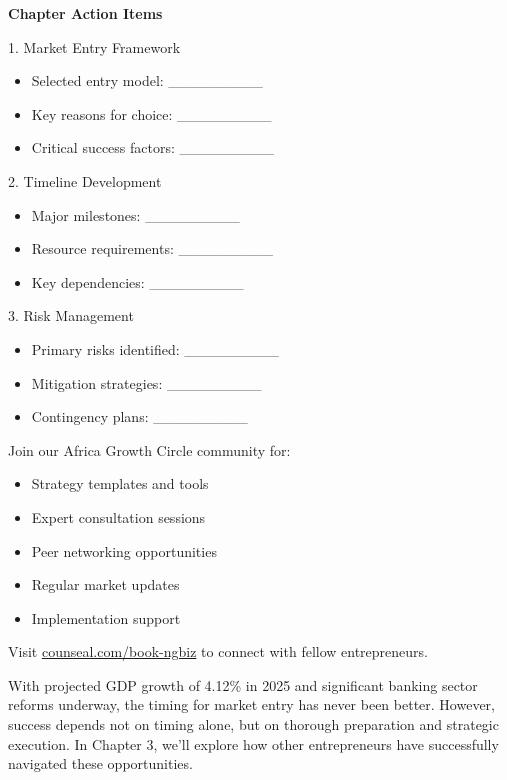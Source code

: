 \begin{workshopbox}
\textbf{Chapter Action Items}

1. Market Entry Framework
\begin{itemize}
    \item Selected entry model: \_\_\_\_\_\_\_\_\_
    \item Key reasons for choice: \_\_\_\_\_\_\_\_\_
    \item Critical success factors: \_\_\_\_\_\_\_\_\_
\end{itemize}

2. Timeline Development
\begin{itemize}
    \item Major milestones: \_\_\_\_\_\_\_\_\_
    \item Resource requirements: \_\_\_\_\_\_\_\_\_
    \item Key dependencies: \_\_\_\_\_\_\_\_\_
\end{itemize}

3. Risk Management
\begin{itemize}
    \item Primary risks identified: \_\_\_\_\_\_\_\_\_
    \item Mitigation strategies: \_\_\_\_\_\_\_\_\_
    \item Contingency plans: \_\_\_\_\_\_\_\_\_
\end{itemize}
\end{workshopbox}

\begin{communitybox}
Join our Africa Growth Circle community for:
\begin{itemize}
    \item Strategy templates and tools
    \item Expert consultation sessions
    \item Peer networking opportunities
    \item Regular market updates
    \item Implementation support
\end{itemize}
Visit \href{https://viz.li/csl-book-ngbiz}{counseal.com/book-ngbiz} to connect with fellow entrepreneurs.
\end{communitybox}

\begin{importantbox}
With projected GDP growth of 4.12\% in 2025 and significant banking sector reforms underway, the timing for market entry has never been better. However, success depends not on timing alone, but on thorough preparation and strategic execution. In Chapter 3, we'll explore how other entrepreneurs have successfully navigated these opportunities.
\end{importantbox}